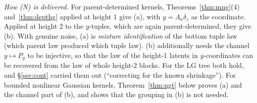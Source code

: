 \documentclass[11pt]{article}
\theoremstyle{definition}
\begin{document}
\noindent\emph{How (N) is delivered.} For parent-determined kernels,
Theorems~\ref{thm:mng}(4) and~\ref{thm:depthg} applied at height 1 give (a), with
$y=\Lambda_n\delta_z$ as the coordinate. Applied at height 2 to the $y$-tuples, which are again
parent-determined, they give (b). With genuine noise, (a) is \emph{mixture identification} of the
bottom tuple law (which parent law produced which tuple law). (b) additionally needs the channel
$y\mapsto P_y$ to be injective, so that the law of the height-1 latents in $y$-coordinates can be
recovered from the law of whole height-2 blocks. For the LG tree both hold, and \S\ref{sec:cont}
carried them out (``correcting for the known shrinkage''). For bounded nonlinear Gaussian kernels,
Theorem~\ref{thm:ngt} below proves (a) and the channel part of (b), and shows that the grouping in
(b) is not needed.
\end{document}
